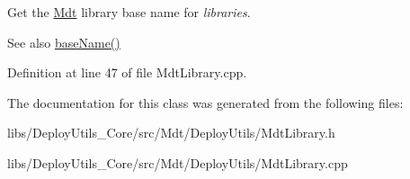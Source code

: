 Get the \hyperlink{namespace_mdt}{Mdt} library base name for {\itshape libraries}. 

\begin{DoxySeeAlso}{See also}
\hyperlink{class_mdt_1_1_deploy_utils_1_1_mdt_library_a3d571e370b2a042e2b110a23c0af8d93}{base\+Name()} 
\end{DoxySeeAlso}


Definition at line 47 of file Mdt\+Library.\+cpp.



The documentation for this class was generated from the following files\+:\begin{DoxyCompactItemize}
\item 
libs/\+Deploy\+Utils\+\_\+\+Core/src/\+Mdt/\+Deploy\+Utils/Mdt\+Library.\+h\item 
libs/\+Deploy\+Utils\+\_\+\+Core/src/\+Mdt/\+Deploy\+Utils/Mdt\+Library.\+cpp\end{DoxyCompactItemize}
